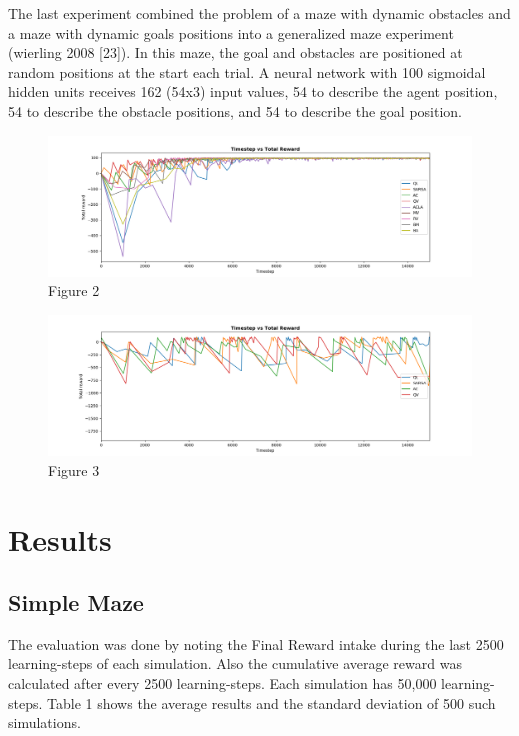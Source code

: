 \documentclass[letterpaper]{article}
\begin{document}
The last experiment combined the problem of a maze with dynamic
obstacles and a maze with dynamic goals positions into a generalized
maze experiment (wierling 2008 {[}23{]}). In this maze, the goal and
obstacles are positioned at random positions at the start each trial. A
neural network with 100 sigmoidal hidden units receives 162 (54x3) input
values, 54 to describe the agent position, 54 to describe the obstacle
positions, and 54 to describe the goal position.

\begin{figure}
\centering
\includegraphics[scale=0.35]{img/Timestep_vs_Total_reward_simple.png}
\caption{Figure 2}
\end{figure}

\begin{figure}
\centering
\includegraphics[scale=0.35]{img/Timestep_vs_Total_reward.png}
\caption{Figure 3}
\end{figure}

\section{Results}\label{results}
\subsection{Simple Maze}\label{simple-maze}

The evaluation was done by noting the Final Reward intake during the
last 2500 learning-steps of each simulation. Also the cumulative average
reward was calculated after every 2500 learning-steps. Each simulation
has 50,000 learning-steps. Table 1 shows the average results and the
standard deviation of 500 such simulations.
\end{document}
